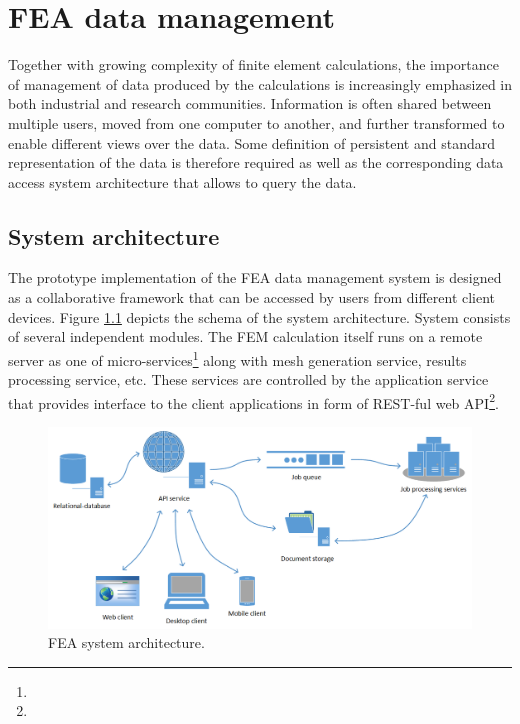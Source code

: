\chapter{FEA data management}
\label{chapter:data-management}

Together with growing complexity of finite element calculations, the importance of management of data produced by the calculations is increasingly emphasized in both industrial and research communities. Information is often shared between multiple users, moved from one computer to another, and further transformed to enable different views over the data. Some definition of persistent and standard representation of the data is therefore required as well as the corresponding data access system architecture that allows to query the data.

\section{System architecture}
\label{sec:system-architecture}

The prototype implementation of the FEA data management system is designed as a collaborative framework that can be accessed by users from different client devices. Figure \ref{fig:FEA-architecture} depicts the schema of the system architecture. System consists of several independent modules. The FEM calculation itself runs on a remote server as one of micro-services\footnote{} along with mesh generation service, results processing service, etc. These services are controlled by the application service that provides interface to the client applications in form of REST-ful web API\footnote{}.

\begin{figure}[H]
    \centering
    \includegraphics[width=\textwidth]{figures/chapter-data-management/FEA-architecture}
    \decoRule
    \caption{FEA system architecture.}
    \label{fig:FEA-architecture}
\end{figure}

